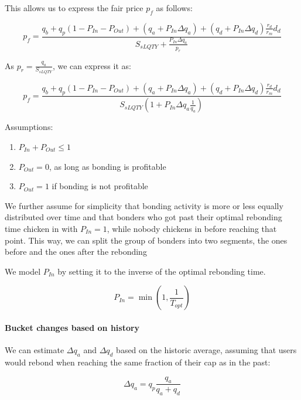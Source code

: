 \documentclass{article}
\begin{document}
This allows us to express the fair price $p_f$ as follows:

\begin{equation}
  \label{}
    p_{f} = \frac{q_{b}+q_{p}(1-P_{In}-P_{Out})+(q_{a}+ P_{In}\Delta q_{a})+(q_{d} + P_{In}\Delta q_{d})\frac{r_{d}}{r_{m}}d_{d}}{S_{sLQTY} + \frac{P_{In}\Delta q_a}{p_r}}
\end{equation}

As $p_r = \frac{q_a}{S_{sLQTY}}$, we can express it as:

\begin{equation}
  \label{eq:recursive_hist}
    p_{f} = \frac{q_{b}+q_{p}(1-P_{In}-P_{Out})+(q_{a}+ P_{In}\Delta q_{a})+(q_{d} + P_{In}\Delta q_{d})\frac{r_{d}}{r_{m}}d_{d}}{S_{sLQTY} \left( 1+P_{In} \Delta q_{a} \frac{1}{q_{a}} \right)}
\end{equation}

Assumptions:

\begin{enumerate}
	\item $P_{In} + P_{Out} \leq 1$
	\item $P_{Out} = 0$, as long as bonding is profitable
	\item $P_{Out} = 1$ if bonding is not profitable
\end{enumerate}

We further assume for simplicity that bonding activity is more or less equally distributed over time and that bonders who got past their optimal rebonding time chicken in with $P_{In}=1$, while nobody chickens in before reaching that point.
This way, we can split the group of bonders into two segments, the ones before and the ones after the rebonding

We model $P_{In}$ by setting it to the inverse of the optimal rebonding time.

\begin{equation}
    P_{In} = \min \left(1,\frac{1}{T_{opt}}\right)
\end{equation} 

\paragraph{Bucket changes based on history}
We can estimate $\Delta q_{a}$ and $\Delta q_{d}$ based on the historic average, assuming that users would rebond when reaching the same fraction of their cap as in the past:

\begin{equation}
\Delta q_{a} = q_{p} \frac{q_{a}}{q_{a}+q_{d}}
\end{equation}
\end{document}

